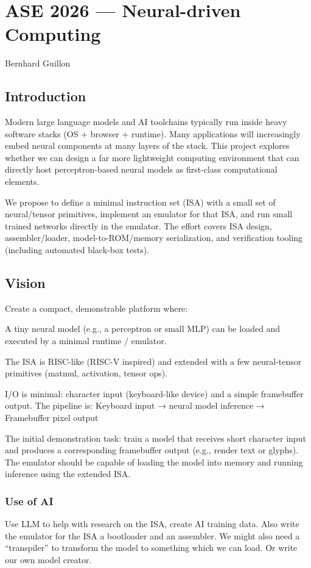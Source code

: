\documentclass[
  conference]{IEEEtran}
\author{}
\date{}
\begin{document}
\hypertarget{ase-2026-neural-driven-computing}{%
\section{ASE 2026 --- Neural-driven
Computing}\label{ase-2026-neural-driven-computing}}

Bernhard Guillon

\hypertarget{introduction}{%
\subsection{Introduction}\label{introduction}}

Modern large language models and AI toolchains typically run inside
heavy software stacks (OS + browser + runtime). Many applications will
increasingly embed neural components at many layers of the stack. This
project explores whether we can design a far more lightweight computing
environment that can directly host perceptron-based neural models as
first-class computational elements.

We propose to define a minimal instruction set (ISA) with a small set of
neural/tensor primitives, implement an emulator for that ISA, and run
small trained networks directly in the emulator. The effort covers ISA
design, assembler/loader, model-to-ROM/memory serialization, and
verification tooling (including automated black‑box tests).

\hypertarget{vision}{%
\subsection{Vision}\label{vision}}

Create a compact, demonstrable platform where:

A tiny neural model (e.g., a perceptron or small MLP) can be loaded and
executed by a minimal runtime / emulator.

The ISA is RISC-like (RISC-V inspired) and extended with a few
neural-tensor primitives (matmul, activation, tensor ops).

I/O is minimal: character input (keyboard-like device) and a simple
framebuffer output. The pipeline is: Keyboard input → neural model
inference → Framebuffer pixel output

The initial demonstration task: train a model that receives short
character input and produces a corresponding framebuffer output (e.g.,
render text or glyphs). The emulator should be capable of loading the
model into memory and running inference using the extended ISA.

\hypertarget{use-of-ai}{%
\subsubsection{Use of AI}\label{use-of-ai}}

Use LLM to help with research on the ISA, create AI training data. Also
write the emulator for the ISA a bootloader and an assembler. We might
also need a ``transpiler'' to transform the model to something which we
can load. Or write our own model creator.
\end{document}
